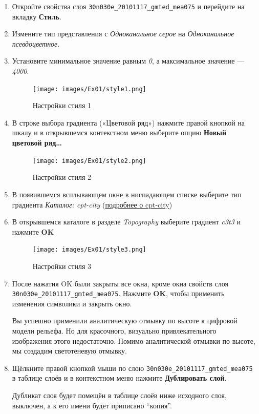 \documentclass[
  12pt,
]{book}
\begin{document}
\begin{enumerate}
\def\labelenumi{\arabic{enumi}.}
\item
  Откройте свойства слоя \texttt{30n030e\_20101117\_gmted\_mea075} и перейдите на вкладку \textbf{Стиль}.
\item
  Измените тип представления с \emph{Одноканальное серое} на \emph{Одноканальное псевдоцветное}.
\item
  Установите минимальное значение равным \emph{0}, а максимальное значение --- \emph{4000}.

  \begin{figure}
  \centering
  \texttt{[image: images/Ex01/style1.png]}
  \caption{Настройки стиля 1}
  \end{figure}
\item
  В строке выбора градиента («Цветовой ряд») нажмите правой кнопкой на шкалу и в открывшемся контекстном меню выберите опцию \textbf{Новый цветовой ряд\ldots{}}

  \begin{figure}
  \centering
  \texttt{[image: images/Ex01/style2.png]}
  \caption{Настройки стиля 2}
  \end{figure}
\item
  В появившемся всплывающем окне в ниспадающем списке выберите тип градиента \emph{Каталог: cpt-city} (\href{http://soliton.vm.bytemark.co.uk/pub/cpt-city/}{подробнее о cpt-city})
\item
  В открывшемся каталоге в разделе \emph{Topography} выберите градиент \emph{c3t3} и нажмите \textbf{OK}

  \begin{figure}
  \centering
  \texttt{[image: images/Ex01/style3.png]}
  \caption{Настройки стиля 3}
  \end{figure}
\item
  После нажатия OK были закрыты все окна, кроме окна свойств слоя \texttt{30n030e\_20101117\_gmted\_mea075}. Нажмите \textbf{OK}, чтобы применить изменения символики и закрыть окно.

  Вы успешно применили аналитическую отмывку по высоте к цифровой модели рельефа. Но для красочного, визуально привлекательного изображения этого недостаточно. Помимо аналитической отмывки по высоте, мы создадим светотеневую отмывку.
\item
  Щёлкните правой кнопкой мыши по слою \texttt{30n030e\_20101117\_gmted\_mea075} в таблице слоёв и в контекстном меню нажмите \textbf{Дублировать слой}.

  Дубликат слоя будет помещён в таблице слоёв ниже исходного слоя, выключен, а к его имени будет приписано ``копия''.


\end{enumerate}
\end{document}
